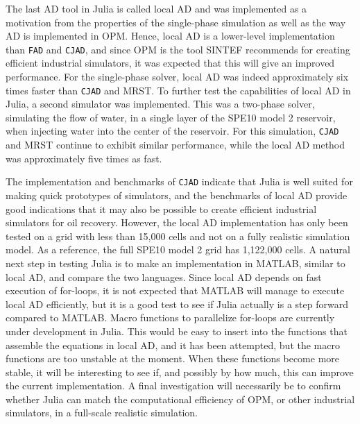 The last AD tool in Julia is called local AD and was implemented as a motivation from the properties of the single-phase simulation as well as the way AD is implemented in OPM. Hence, local AD is a lower-level implementation than \texttt{FAD} and \texttt{CJAD}, and since OPM is the tool SINTEF recommends for creating efficient industrial simulators, it was expected that this will give an improved performance. For the single-phase solver, local AD was indeed approximately six times faster than \texttt{CJAD} and MRST. To further test the capabilities of local AD in Julia, a second simulator was implemented. This was a two-phase solver, simulating the flow of water, in a single layer of the SPE10 model 2 reservoir, when injecting water into the center of the reservoir. For this simulation, \texttt{CJAD} and MRST continue to exhibit similar performance, while the local AD method was approximately five times as fast.

The implementation and benchmarks of \texttt{CJAD} indicate that Julia is well suited for making quick prototypes of simulators, and the benchmarks of local AD provide good indications that it may also be possible to create efficient industrial simulators for oil recovery. However, the local AD implementation has only been tested on a grid with less than 15,000 cells and not on a fully realistic simulation model. As a reference, the full SPE10 model 2 grid has 1,122,000 cells. A natural next step in testing Julia is to make an implementation in MATLAB, similar to local AD, and compare the two languages. Since local AD depends on fast execution of for-loops, it is not expected that MATLAB will manage to execute local AD efficiently, but it is a good test to see if Julia actually is a step forward compared to MATLAB. Macro functions to parallelize for-loops are currently under development in Julia. This would be easy to insert into the functions that assemble the equations in local AD, and it has been attempted, but the macro functions are too unstable at the moment. When these functions become more stable, it will be interesting to see if, and possibly by how much, this can improve the current implementation. A final investigation will necessarily be to confirm whether Julia can match the computational efficiency of OPM, or other industrial simulators, in a full-scale realistic simulation. 

